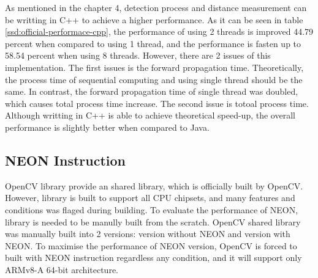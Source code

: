             As mentioned in the chapter 4,
            detection process and distance measurement can be writting in C++ to achieve a higher performance.
            As it can be seen in table \ref{ssd:official-performace-cpp},
            the performance of using 2 threads is improved 44.79 percent when compared to using 1 thread,
            and the performance is fasten up to 58.54 percent when using 8 threads.
            However, there are 2 issues of this implementation.
            The first issues is the forward propagation time.
                Theoretically, the process time of sequential computing and using single thread should be the same.
                In contrast, the forward propagation time of single thread was doubled,
                which causes total process time increase.
            The second issue is totoal process time.
                Although writting in C++ is able to achieve theoretical speed-up,
                the overall performance is slightly better when compared to Java.

        \subsection{NEON Instruction}
            OpenCV library provide an shared library, which is officially built by OpenCV.
            However, library is built to support all CPU chipsets, and many features and conditions was flaged during building.
            To evaluate the performance of NEON, library is needed to be manully built from the scratch.
            OpenCV shared library was manually built into 2 versions: version without NEON and version with NEON.
            To maximise the performance of NEON version, OpenCV is forced to built with NEON instruction regardless any condition,
            and it will support only ARMv8-A 64-bit architecture.

